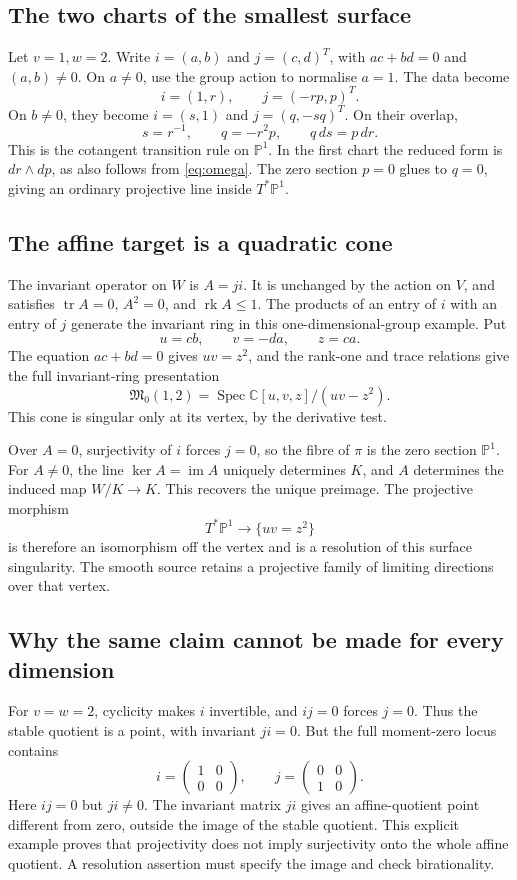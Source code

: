 \documentclass[11pt,a4paper]{article}
\numberwithin{equation}{section}
\theoremstyle{definition}
\newcommand{\PP}{\mathbb P}
\newcommand{\Spec}{\operatorname{Spec}}
\newcommand{\rk}{\operatorname{rk}}
\newcommand{\tr}{\operatorname{tr}}
\newcommand{\im}{\operatorname{im}}
\newcommand{\M}{\mathfrak M}
\begin{document}
\subsection{The two charts of the smallest surface}
Let $v=1,w=2$. Write $i=(a,b)$ and $j=(c,d)^T$, with
$ac+bd=0$ and $(a,b)\ne0$. On $a\ne0$, use the group action
to normalise $a=1$. The data become
\[
 i=(1,r),\qquad j=(-rp,p)^T.
\]
On $b\ne0$, they become $i=(s,1)$ and $j=(q,-sq)^T$.
On their overlap,
\begin{equation}\label{eq:cotangenttransition}
 s=r^{-1},\qquad q=-r^2p,\qquad q\,ds=p\,dr.
\end{equation}
This is the cotangent transition rule on $\PP^1$. In the first
chart the reduced form is $dr\wedge dp$, as also follows from
\eqref{eq:omega}. The zero section $p=0$ glues to $q=0$,
giving an ordinary projective line inside $T^*\PP^1$.

\subsection{The affine target is a quadratic cone}
The invariant operator on $W$ is $A=ji$. It is unchanged by
the action on $V$, and satisfies
$\tr A=0$, $A^2=0$, and $\rk A\le1$. The products of an entry
of $i$ with an entry of $j$ generate the invariant ring in this
one-dimensional-group example. Put
\[
 u=cb,\qquad v=-da,\qquad z=ca.
\]
The equation $ac+bd=0$ gives $uv=z^2$, and the rank-one and
trace relations give the full invariant-ring presentation
\[
 \M_0(1,2)=\Spec\mathbb C[u,v,z]/(uv-z^2).
\]
This cone is singular only at its vertex, by the derivative test.

Over $A=0$, surjectivity of $i$ forces $j=0$, so the fibre of
$\pi$ is the zero section $\PP^1$. For $A\ne0$, the line
$\ker A=\im A$ uniquely determines $K$, and $A$ determines
the induced map $W/K\to K$. This recovers the unique preimage.
The projective morphism
\[
 T^*\PP^1\longrightarrow\{uv=z^2\}
\]
is therefore an isomorphism off the vertex and is a resolution
of this surface singularity. The smooth source retains a
projective family of limiting directions over that vertex.

\subsection{Why the same claim cannot be made for every dimension}
For $v=w=2$, cyclicity makes $i$ invertible, and $ij=0$ forces
$j=0$. Thus the stable quotient is a point, with invariant
$ji=0$. But the full moment-zero locus contains
\[
 i=\begin{pmatrix}1&0\\0&0\end{pmatrix},\qquad
 j=\begin{pmatrix}0&0\\1&0\end{pmatrix}.
\]
Here $ij=0$ but $ji\ne0$. The invariant matrix $ji$ gives an
affine-quotient point different from zero, outside the image of
the stable quotient. This explicit example proves that projectivity
does not imply surjectivity onto the whole affine quotient.
A resolution assertion must specify the image and check birationality.
\end{document}
